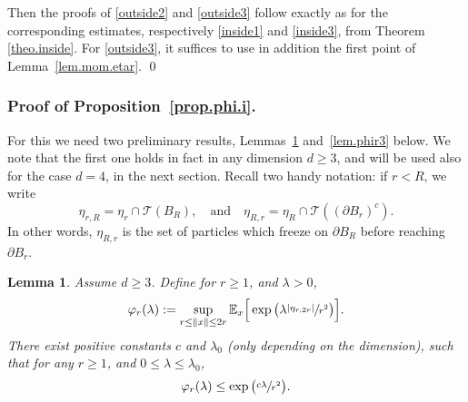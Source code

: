\documentclass[JEP,XML,SOM,Unicode,NoFloatCountersInSection,published]{cedram}
\theoremstyle{plain}
\newtheorem{lemma}[theorem]{Lemma}
\theoremstyle{definition}
\newcommand{\1}{{\text{\Large $\mathfrak 1$}}}
\begin{document}
Then the proofs of \eqref{outside2} and \eqref{outside3} follow exactly as for the corresponding estimates, respectively \eqref{inside1} and \eqref{inside3}, from Theorem \ref{theo.inside}. For \eqref{outside3}, it suffices to use in addition the first point of Lemma~\ref{lem.mom.etar}.
\qed

\subsubsection*{Proof of Proposition~\ref{prop.phi.i}.}
For this we need two preliminary results,
Lemmas~\ref{lem.phir2} and~\ref{lem.phir3} below.
We note that the first one holds in fact in any dimension $d\ge 3$,
and will be used also for the case $d=4$, in the next section. Recall two handy
notation: if $r<R$, we write
\[
\eta_{r,R}=\eta_r\cap \mathcal T(B_R),\quad\text{and}\quad
\eta_{R,r}=\eta_R\cap \mathcal T((\partial B_r)^c).
\]
In other words, $\eta_{R,r}$ is the set of particles which freeze on $\partial B_R$ before reaching $\partial B_r$.
\begin{lemma}\label{lem.phir2} Assume $d\ge 3$.
Define for $r\ge 1$, and $\lambda>0$,
\[
\varphi_r(\lambda):= \sup_{r\le \|x\|\le 2r}
\mathbb E_x \Big[\exp\big(\lambda\sfrac{|\eta_{r,2r}|}{r^2}\big)\Big].
\]
There exist positive constants $c$ and $\lambda_0$
(only depending on the dimension),
such that for any $r\ge 1$, and $0\le \lambda\le \lambda_0$,
\[
\varphi_r(\lambda) \le \exp\big(\sfrac{c\lambda}{r^2}\big).
\]
\end{lemma}
\end{document}
